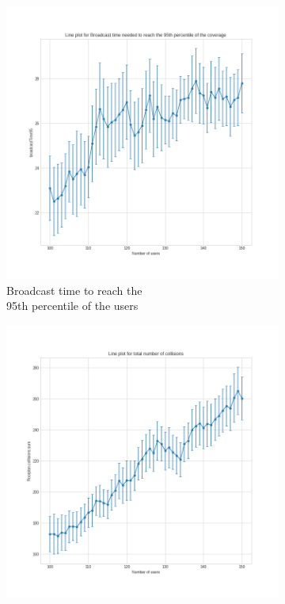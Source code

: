 \clearpage
{}
\begin{figure}[p]
	\centering
	\begin{subfigure}[b]{0.45\textwidth}
		\centering
		\includegraphics[width=\textwidth]{img/continuity-broadcasttime}
		\caption{Broadcast time to reach the\\95th percentile of the
		users}
	\end{subfigure}
	\hfill
	\begin{subfigure}[b]{0.45\textwidth}
		\centering
		\includegraphics[width=\textwidth]{img/continuity-collisions}

\end{subfigure}
\end{figure}
